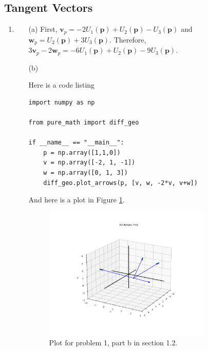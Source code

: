 \documentclass[12pt]{article}
\numberwithin{theorem}{section}
\numberwithin{equation}{section}
\numberwithin{remark}{section}
\numberwithin{definition}{section}
\numberwithin{theorem}{section}
\numberwithin{lemma}{section}
\numberwithin{example}{section}
\begin{document}
\subsection{Tangent Vectors}
\begin{enumerate}
	\item{
		\begin{enumerate}
			\item[(a)]{First, $\textbf{v}_p=-2U_1(\textbf{p})+U_2(\textbf{p})-U_3(\textbf{p})$ and $\textbf{w}_p=U_2(\textbf{p})+3U_3(\textbf{p})$. Therefore, $3\textbf{v}_p-2\textbf{w}_p=-6U_1(\textbf{p})+U_2(\textbf{p})-9U_3(\textbf{p})$.}
			\item[(b)]{Here is a code listing 
				\begin{lstlisting}
import numpy as np

from pure_math import diff_geo

if __name__ == "__main__":
	p = np.array([1,1,0])
	v = np.array([-2, 1, -1])
	w = np.array([0, 1, 3])
	diff_geo.plot_arrows(p, [v, w, -2*v, v+w])
				\end{lstlisting}
			}
			And here is a plot in Figure \ref{fig:01_02_prob_01_b}.
			\begin{figure}[ht]
				\centering
				\includegraphics[width=0.8\textwidth]{fig/sec_01_02_prob_01_b.png}
				\caption{Plot for problem 1, part b in section 1.2.}
  				\label{fig:01_02_prob_01_b}
			\end{figure}


\end{enumerate}}
\end{enumerate}
\end{document}

